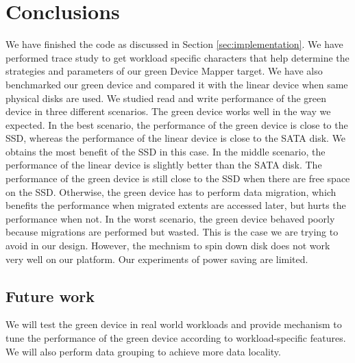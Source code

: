 \section{Conclusions}
\label{sec:conc}

We have finished the code as discussed in Section
\ref{sec:implementation}. We have performed trace study to get
workload specific characters that help determine the strategies and
parameters of our green Device Mapper target. We have also benchmarked
our green device and compared it with the linear device when same
physical disks are used. We studied read and write performance of the
green device in three different scenarios. The green device works well
in the way we expected. In the best scenario, the performance of the
green device is close to the SSD, whereas the performance of the
linear device is close to the SATA disk. We obtains the most benefit
of the SSD in this case. In the middle scenario, the performance of
the linear device is slightly better than the SATA disk. The
performance of the green device is still close to the SSD when there
are free space on the SSD. Otherwise, the green device has to perform
data migration, which benefits the performance when migrated extents
are accessed later, but hurts the performance when not. In the worst
scenario, the green device behaved poorly because migrations are
performed but wasted. This is the case we are trying to avoid in our
design. However, the mechnism to spin down disk does not work very
well on our platform. Our experiments of power saving are limited. 

\subsection{Future work}

We will test the green device in real world workloads and provide
mechanism to tune the performance of the green device according to
workload-specific features. We will also perform data grouping to
achieve more data locality. 


